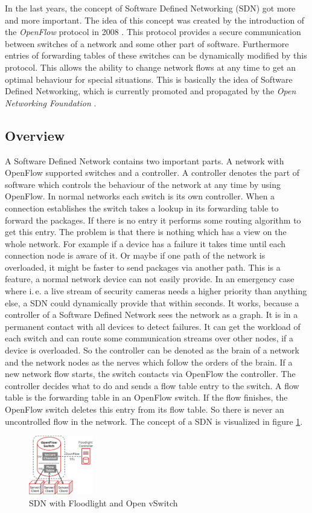 In the last years, the concept of Software Defined Networking (SDN) got more and more important. The idea of this concept was created by the introduction of the \textit{OpenFlow} protocol in 2008 \cite{Mc2008}. This protocol provides a secure communication between switches of a network and some other part of software. Furthermore entries of forwarding tables of these switches can be dynamically modified by this protocol. This allows the ability to change network flows at any time to get an optimal behaviour for special situations. This is basically the idea of Software Defined Networking, which is currently promoted and propagated by the \textit{Open Networking Foundation} \cite{onf}. 
\subsection{Overview}
A Software Defined Network contains two important parts. A network with OpenFlow supported switches and a controller. A controller denotes the part of software which controls the behaviour of the network at any time by using OpenFlow. In normal networks each switch is its own controller. When a connection establishes the switch takes a lookup in its forwarding table to forward the packages. If there is no entry it performs some routing algorithm to get this entry. The problem is that there is nothing which has a view on the whole network. For example if a device has a failure it takes time until each connection node is aware of it. Or maybe if one path of the network is overloaded, it might be faster to send packages via another path. This is a feature, a normal network device can not easily provide. In an emergency case where i.\,e. a live stream of security cameras needs a higher priority than anything else, a SDN could dynamically provide that within seconds. It works, because a controller of a Software Defined Network sees the network as a graph. It is in a permanent contact with all devices to detect failures. It can get the workload of each switch and can route some communication streams over other nodes, if a device is overloaded. So the controller can be denoted as the brain of a network and the network nodes as the nerves which follow the orders of the brain. If a new network flow starts, the switch contacts via OpenFlow the controller. The controller decides what to do and sends a flow table entry to the switch. A flow table is the forwarding table in an OpenFlow switch. If the flow finishes, the OpenFlow switch deletes this entry from its flow table. So there is never an uncontrolled flow in the network. The concept of a SDN is visualized in figure \ref{sdn}.\\
\begin{figure}[ht]
\centering
\includegraphics[width=0.25\textwidth]{img/sdn} 

\caption{SDN with Floodlight and Open vSwitch}
\label{sdn}
\end{figure}
 


